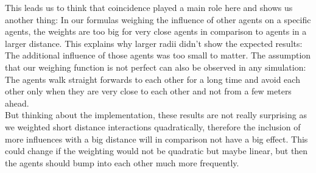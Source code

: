 \noi This leads us to think that coincidence played a main role here and shows us another thing: In our formulas weighing the influence of other agents on a specific agents, the weights are too big for very close agents in comparison to agents in a larger distance. This explains why larger radii didn't show the expected results: The additional influence of those agents was too small to matter. The assumption that our weighing function is not perfect can also be observed in any simulation: The agents walk straight forwards to each other for a long time and avoid each other only when they are very close to each other and not from a few meters ahead.\\
\noi But thinking about the implementation, these results are not really surprising as we weighted short distance interactions quadratically, therefore the inclusion of more influences with a big distance will in comparison not have a big effect. This could change if the weighting would not be quadratic but maybe linear, but then the agents should bump into each other much more frequently.\\
